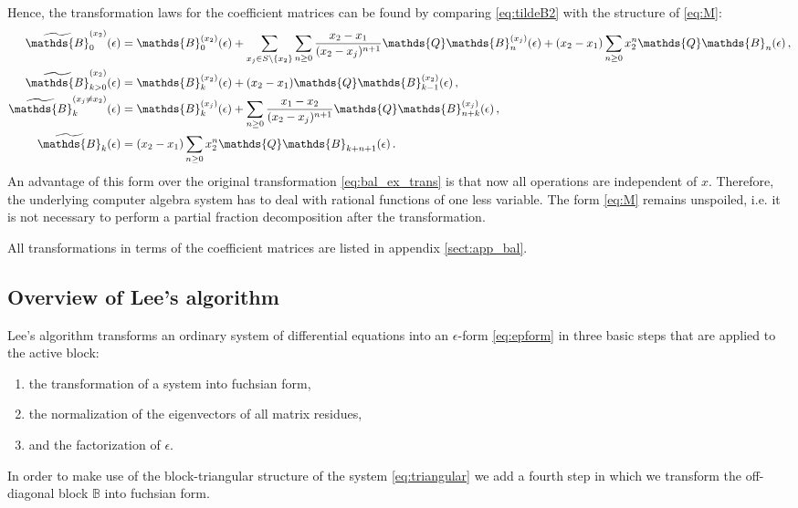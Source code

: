 \documentclass[12pt]{article}
\numberwithin{equation}{section}
\numberwithin{figure}{section}
\newcommand{\B}{\mathds{B}}
\newcommand{\Q}{\mathds{Q}}
\begin{document}
      Hence, the transformation laws for the coefficient matrices can be found by comparing \eqref{eq:tildeB2} with the structure of \eqref{eq:M}:
      \begin{align*}
        \widetilde\B^{(x_2)}_0(\epsilon)
        &=
        \B^{(x_2)}_0(\epsilon)
        +
        \sum\limits_{x_j \in S\backslash\{x_2\}} 
        \sum\limits_{n\geq0} 
        \frac{x_2-x_1}{(x_2-x_j)^{n+1}}
        \Q \B^{(x_j)}_n(\epsilon)
        +
        (x_2-x_1)
        \sum\limits_{n\geq0} 
        x_2^n \Q \B_n(\epsilon)
        \,, \\
        \widetilde\B^{(x_2)}_{k>0}(\epsilon)
        &=
        \B^{(x_2)}_k(\epsilon)
        +
        (x_2-x_1) \Q \B^{(x_2)}_{k-1}(\epsilon)
        \,, \\
        \widetilde\B^{(x_j\neq x_2)}_k(\epsilon)
        &=
        \B^{(x_j)}_k(\epsilon)
        +
        \sum\limits_{n\geq0} 
        \frac{x_1-x_2}{(x_2-x_j)^{n+1}}
        \Q \B^{(x_j)}_{n+k}(\epsilon)
        \,, \\
        \widetilde\B_k(\epsilon)
        &=
        (x_2-x_1)
        \sum\limits_{n\geq0} 
        x_2^n 
        \Q \B_{k+n+1}(\epsilon)
        \,.
      \end{align*}
      An advantage of this form over the original transformation \eqref{eq:bal_ex_trans} is that now all operations are independent of $x$.
      Therefore, the underlying computer algebra system has to deal with rational functions of one less variable.
      The form \eqref{eq:M} remains unspoiled, i.e. it is not necessary to perform a partial fraction decomposition after the transformation.

      All transformations in terms of the coefficient matrices are listed in appendix \ref{sect:app_bal}.
    \subsection{Overview of Lee's algorithm} \label{sect:lee}
      Lee's algorithm\cite{Lee:2014ioa} transforms an ordinary system of differential equations into an $\epsilon$-form \eqref{eq:epform} in three basic steps that are applied to the active block:
      \begin{enumerate}
        \item the transformation of a system into fuchsian form,
        \item the normalization of the eigenvectors of all matrix residues,
        \item and the factorization of $\epsilon$.
      \end{enumerate}        
      In order to make use of the block-triangular structure of the system \eqref{eq:triangular} we add a fourth step in which we transform the off-diagonal block $\B$ into fuchsian form.
\end{document}
